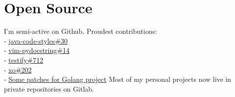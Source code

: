 \section*{Open Source}
{ %
  I'm semi-active on Github. Proudest contributions: \\
  - \href{https://github.com/square/java-code-styles/pull/30}{java-code-styles\#30} \\
  - \href{https://github.com/heavenshell/vim-pydocstring/pull/14}{vim-pydocstring\#14} \\
  - \href{https://github.com/stretchr/testify/pull/712}{testify\#712}\\
  - \href{https://github.com/xo/xo/pull/202}{xo\#202} \\
  - \href{https://go-review.googlesource.com/q/owner:letientai299}{Some patches for Golang project}
  \break
  \break
  Most of my personal projects now live in private repositories on Gitlab.
}
